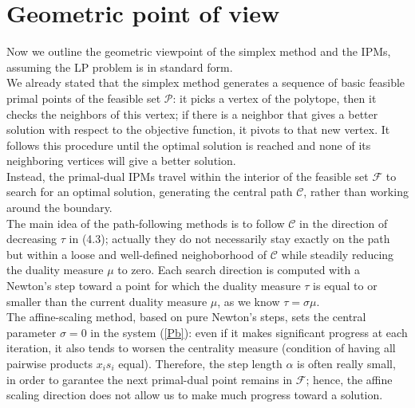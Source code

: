 \documentclass[a4paper,10 pt,titlepage,twoside]{book}
\theoremstyle{plain}
\theoremstyle{definition}
\theoremstyle{remark}
\begin{document}
\section*{Geometric point of view}
Now we outline the geometric viewpoint of the simplex method and the IPMs, assuming the LP problem is in standard form.\\
We already stated that the simplex method generates a sequence of basic feasible primal points of the feasible set $\mathcal{P}$: it picks a vertex of the polytope, then it checks the neighbors of this vertex; if there is a neighbor that gives a
better solution with respect to the objective function, it pivots to that new vertex.
It follows this procedure until the optimal solution is reached and none of its neighboring vertices will give
a better solution.\\Instead, the primal-dual IPMs travel within the interior of the feasible set $\mathcal{F}$ to search for an optimal solution, generating the central path $\mathcal{C}$, rather than working around the boundary.\\ The main idea of the path-following methods is to follow $\mathcal{C}$ in the direction of decreasing $\tau$ in (4.3); actually they do not necessarily stay exactly on the path but within a loose and well-defined neighoborhood of $\mathcal{C}$ while steadily reducing the duality measure $\mu$ to zero. Each search direction is computed with a Newton's step toward a point for which the duality measure $\tau$ is equal to or smaller than the current duality measure $\mu$, as we know $\tau=\sigma\mu$. \\
The affine-scaling method, based on pure Newton's steps, sets the central parameter $\sigma= 0$ in the system (\ref{Pb}):
even if it makes significant progress at each iteration, it also tends to worsen the centrality measure (condition of having all pairwise products $x_{i}s_{i}$ equal). Therefore, the step length $\alpha$ is often really small, in order to garantee the next primal-dual point remains in $\mathcal{F}$; hence, the affine scaling direction does not allow us to make much progress toward a solution.\\ 
\end{document}

